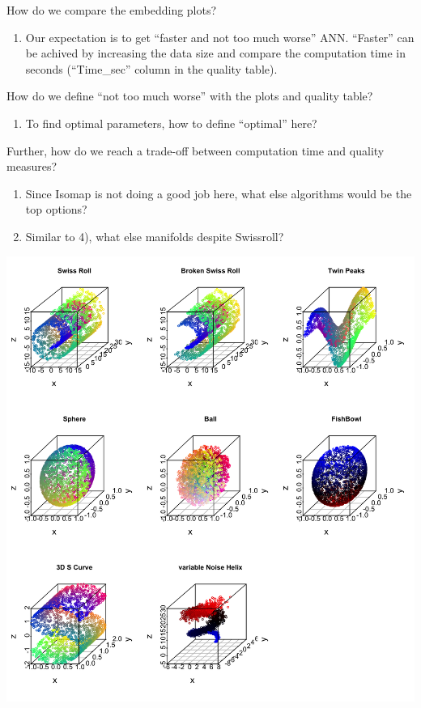 \documentclass[11pt,a4paper,]{article}
\providecommand{\tightlist}{%
  \setlength{\itemsep}{0pt}\setlength{\parskip}{0pt}}
\begin{document}
How do we compare the embedding plots?

\begin{enumerate}
\def\labelenumi{\arabic{enumi})}
\setcounter{enumi}{1}
\tightlist
\item
  Our expectation is to get ``faster and not too much worse'' ANN. ``Faster'' can be achived by increasing the data size and compare the computation time in seconds (``Time\_sec'' column in the quality table).
\end{enumerate}

How do we define ``not too much worse'' with the plots and quality table?

\begin{enumerate}
\def\labelenumi{\arabic{enumi})}
\setcounter{enumi}{2}
\tightlist
\item
  To find optimal parameters, how to define ``optimal'' here?
\end{enumerate}

Further, how do we reach a trade-off between computation time and quality measures?

\begin{enumerate}
\def\labelenumi{\arabic{enumi})}
\setcounter{enumi}{3}
\item
  Since Isomap is not doing a good job here, what else algorithms would be the top options?
\item
  Similar to 4), what else manifolds despite Swissroll?
\end{enumerate}

\begin{center}\includegraphics[width=0.8\linewidth]{figures/manifolds} \end{center}
\newpage

\setlength{\parindent}{-0.2in}
\setlength{\leftskip}{0.2in}
\setlength{\parskip}{8pt}
\vspace*{-0.2in}

\noindent

\printbibliography
\end{document}
